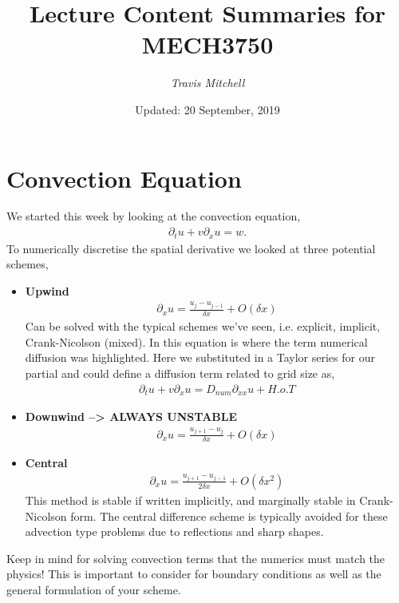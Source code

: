 \documentclass[11pt,a4paper]{report}
\author{\textit{Travis Mitchell}}
\title{Lecture Content Summaries for MECH3750}
\date{Updated: 20 September, 2019}
\theoremstyle{definition}
\begin{document}
\section{Convection Equation}
We started this week by looking at the convection equation,
\begin{align*}
	\partial_t u + v \partial_x u = w.
\end{align*}
To numerically discretise the spatial derivative we looked at three potential schemes, 
\begin{itemize}
	\item \textbf{Upwind} \\
	\begin{align*}
		\partial_x u = \frac{u_j - u_{j-1}}{\delta x} + O(\delta x)
	\end{align*}
	Can be solved with the typical schemes we've seen, i.e. explicit, implicit, Crank-Nicolson (mixed). In this equation is where the term numerical diffusion was highlighted. Here we substituted in a Taylor series for our partial and could define a diffusion term related to grid size as,
	\begin{align*}
		\partial_t u + v \partial_x u = D_{num} \partial_{xx} u+ H.o.T
	\end{align*}
	\item \textbf{Downwind --> ALWAYS UNSTABLE}
	\begin{align*}
	\partial_x u = \frac{u_{j+1} - u_{j}}{\delta x} + O(\delta x)
	\end{align*}
	\item \textbf{Central}
	\begin{align*}
	\partial_x u = \frac{u_{j+1} - u_{j-1}}{2\delta x} + O(\delta x^2)
	\end{align*}
	This method is stable if written implicitly, and marginally stable in Crank-Nicolson form. The central difference scheme is typically avoided for these advection type problems due to reflections and sharp shapes.
\end{itemize}

Keep in mind for solving convection terms that the numerics must match the physics! This is important to consider for boundary conditions as well as the general formulation of your scheme.
\end{document}
